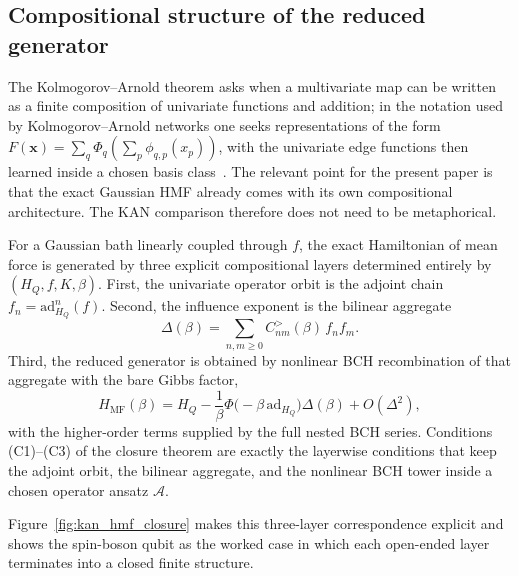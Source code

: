 \subsection{Compositional structure of the reduced generator}
\label{subsec:compositional_structure}

The Kolmogorov--Arnold theorem asks when a multivariate map can be written as a
finite composition of univariate functions and addition; in the notation used
by Kolmogorov--Arnold networks one seeks representations of the form
\(F(\mathbf x)=\sum_q \Phi_q(\sum_p \phi_{q,p}(x_p))\), with the univariate
edge functions then learned inside a chosen basis
class~\cite{liuKANKolmogorovArnoldNetworks2024}. The relevant point for the
present paper is that the exact Gaussian HMF already comes with its own
compositional architecture. The KAN comparison therefore does not need to be
metaphorical.

\begin{proposition}
For a Gaussian bath linearly coupled through $f$, the exact Hamiltonian of mean
force is generated by three explicit compositional layers determined entirely
by $(H_Q,f,K,\beta)$. First, the univariate operator orbit is the adjoint chain
\(f_n=\mathrm{ad}_{H_Q}^n(f)\). Second, the influence exponent is the bilinear
aggregate
\begin{equation}
    \Delta(\beta)=\sum_{n,m\ge0} C^>_{nm}(\beta)\,f_n f_m .
\end{equation}
Third, the reduced generator is obtained by nonlinear BCH recombination of that
aggregate with the bare Gibbs factor,
\begin{equation}
    H_{\mathrm{MF}}(\beta)
    = H_Q-\frac{1}{\beta}\Phi\!\big(-\beta\,\mathrm{ad}_{H_Q}\big)\Delta(\beta)
    + O(\Delta^2),
\end{equation}
with the higher-order terms supplied by the full nested BCH series. Conditions
(C1)--(C3) of the closure theorem are exactly the layerwise conditions that
keep the adjoint orbit, the bilinear aggregate, and the nonlinear BCH tower
inside a chosen operator ansatz $\mathcal A$.
\end{proposition}

Figure~\ref{fig:kan_hmf_closure} makes this three-layer correspondence explicit
and shows the spin-boson qubit as the worked case in which each open-ended
layer terminates into a closed finite structure.


